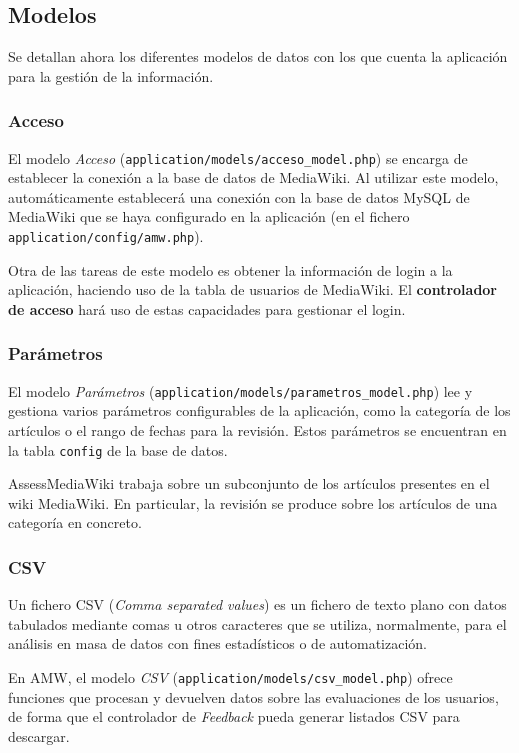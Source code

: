 \documentclass[11pt]{article}
\begin{document}
\subsection{Modelos}

Se detallan ahora los diferentes modelos de datos con los que cuenta la
aplicación para la gestión de la información.

\subsubsection{Acceso}

El modelo \textit{Acceso} (\texttt{application/models/acceso\_model.php}) se encarga
de establecer la conexión a la base de datos de MediaWiki. Al utilizar este
modelo, automáticamente establecerá una conexión con la base de datos MySQL de
MediaWiki que se haya configurado en la aplicación (en el fichero
\texttt{application/config/amw.php}).

Otra de las tareas de este modelo es obtener la información de login a la
aplicación, haciendo uso de la tabla de usuarios de MediaWiki. El
\textbf{controlador de acceso} hará uso de estas capacidades para gestionar el
login.

\subsubsection{Parámetros}

El modelo \textit{Parámetros}
(\texttt{application/models/parametros\_model.php}) lee y gestiona varios
parámetros configurables de la aplicación, como la categoría de los artículos o
el rango de fechas para la revisión. Estos parámetros se encuentran en la tabla
\texttt{config} de la base de datos.

AssessMediaWiki trabaja sobre un subconjunto de los artículos presentes en el
wiki MediaWiki. En particular, la revisión se produce sobre los artículos de una
categoría en concreto.

\subsubsection{CSV}

Un fichero CSV (\textit{Comma separated values}) es un fichero de texto plano
con datos tabulados mediante comas u otros caracteres que se utiliza,
normalmente, para el análisis en masa de datos con fines estadísticos o de
automatización.

En AMW, el modelo \textit{CSV} (\texttt{application/models/csv\_model.php})
ofrece funciones que procesan y devuelven datos sobre las evaluaciones de los
usuarios, de forma que el controlador de \textit{Feedback} pueda generar
listados CSV para descargar.
\end{document}
